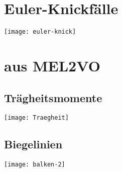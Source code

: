 \appendix
\section{Euler-Knickfälle}
	\begin{center}
		\texttt{[image: euler-knick]}
	\end{center}

\section{aus MEL2VO}
\subsection{Trägheitsmomente}
	\begin{center}
		\texttt{[image: Traegheit]}
	\end{center}
	
\subsection{Biegelinien}
	\begin{center}
		\texttt{[image: balken-2]}
	\end{center}